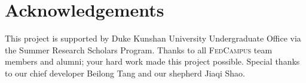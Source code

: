 \documentclass[11pt,a4paper,oneside]{report}
\newcommand{\instructions}[1]{{\color{orange}\itshape #1}}
\renewcommand{\instructions}[1]{} %
\newcommand{\fedcampus}{\textsc{FedCampus}\xspace}
\begin{document}
\vspace{4\bigskipamount}


\instructions{摘要（中文）：150 - 200
    字。摘要是对问题或研究目的的简要说明。说明所使用的理论工作或实验计划，总结研究的主要发现，
    并指出主要结论。适用时应包括适当的安全信息。这应该是您最后编写的部分，
    以确保它准确反映文档的内容。}



\chapter*{Acknowledgements}
\label{acknowledgements}

\instructions{Individuals and organizations who helped with the research project
    and provided financing are thanked in a paragraph of the thesis. Do not
    include individual titles in the acknowledgments. However, it is
    appropriate to state grant numbers and sponsors. Examples would like
    SELF, SRS, SW Grants, etc.}

This project is supported by Duke Kunshan University Undergraduate Office via
the Summer Research Scholars Program. Thanks to all \fedcampus team members and
alumni; your hard work made this project possible.
Special thanks to our chief developer Beilong Tang and our shepherd Jiaqi Shao.

\newpage


\setcounter{tocdepth}{1}
\listoffigures\newpage


\setcounter{tocdepth}{1}
\listoftables\newpage


\clearpage
{}
\end{document}
